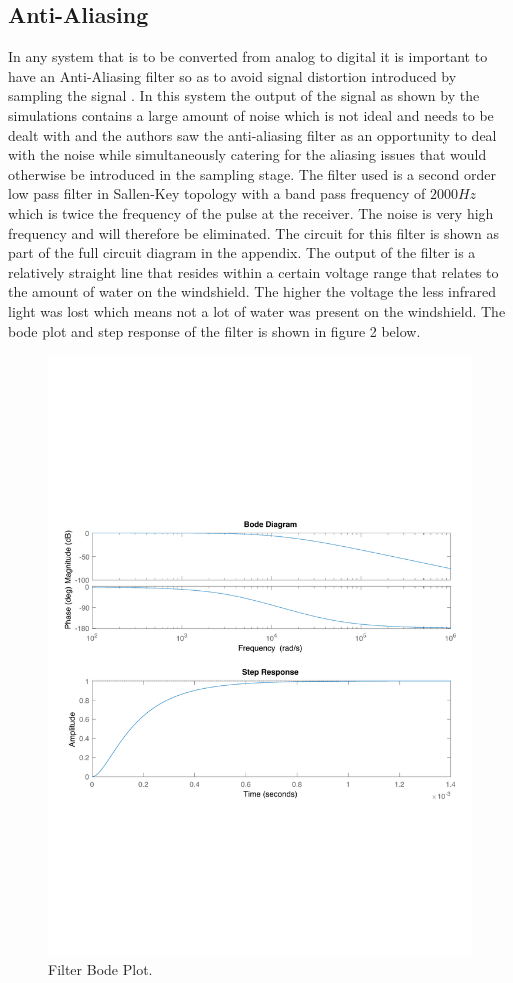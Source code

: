 \documentclass[conference, 11pt]{IEEEtran}
\begin{document}
\subsection{Anti-Aliasing}
In any system that is to be converted from analog to digital it is important to have an Anti-Aliasing filter so as to avoid signal distortion introduced by sampling the signal \cite{FILT}. In this system the output of the signal as shown by the simulations contains a large amount of noise which is not ideal and needs to be dealt with and the authors saw the anti-aliasing filter as an opportunity to deal with the noise while simultaneously catering for the aliasing issues that would otherwise be introduced in the sampling stage. The filter used is a second order low pass filter in Sallen-Key topology with a band pass frequency of $2000Hz$ which is twice the frequency of the pulse at the receiver. The noise is very high frequency and will therefore be eliminated. The circuit for this filter is shown as part of the full circuit diagram in the appendix. The output of the filter is a relatively straight line that resides within a certain voltage range that relates to the amount of water on the windshield. The higher the voltage the less infrared light was lost which means not a lot of water was present on the windshield. The bode plot and step response of the filter is shown in figure 2 below. 

 \begin{figure}[H]
 \centering 
 \includegraphics[width=\columnwidth]{BodeStep}
 \centering 
  \caption {Filter Bode Plot. }
 \end{figure}
\end{document}
